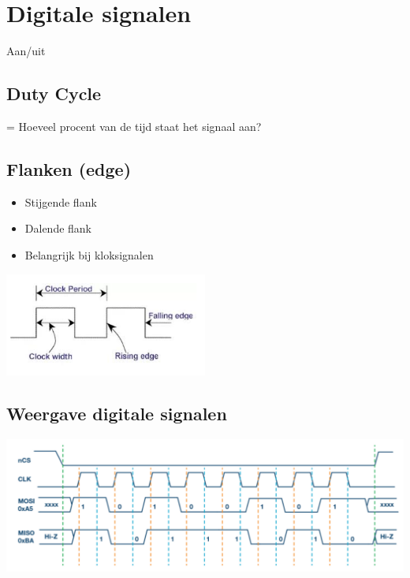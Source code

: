 \documentclass{article}
\begin{document}
\section{Digitale signalen}
Aan/uit


\subsection{Duty Cycle}
= Hoeveel procent van de tijd staat het signaal aan?

\subsection{Flanken (edge)}
\begin{itemize}
    \item Stijgende flank
    \item Dalende flank
    \item Belangrijk bij kloksignalen
\end{itemize}

\includegraphics[width=0.5\textwidth]{Screenshot_20200217_123230.png}

\subsection{Weergave digitale signalen}
\includegraphics[width=1\textwidth]{Screenshot_20200217_125726.png}
\end{document}
